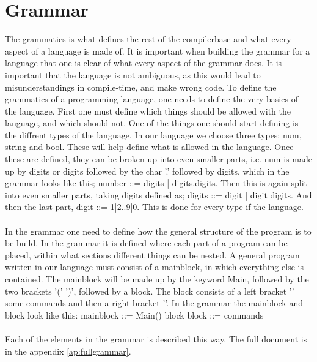\section{Grammar}
The grammatics is what defines the rest of the compilerbase and what every aspect of a language is made of.
It is important when building the grammar for a language that one is clear of what every aspect of the grammar does. It is important that the language is not ambiguous, as this would lead to misunderstandings in compile-time, and make wrong code.
To define the grammatics of a programming language, one needs to define the very basics of the language. First one must define which things should be allowed with the language, and which should not.
One of the things one should start defining is the diffrent types of the language. In our language we choose three types; num, string and bool. These will help define what is allowed in the language. Once these are defined, they can be broken up into even smaller parts, i.e. num is made up by digits or digits followed by the char '.' followed by digits, which in the grammar looks like this; number ::= digits | digits.digits.
Then this is again split into even smaller parts, taking digits defined as; digits ::= digit | digit digits. And then the last part, digit ::= 1|2..9|0. This is done for every type if the language.\\
\\
In the grammar one need to define how the general structure of the program is to be build. In the grammar it is defined where each part of a program can be placed, within what sections different things can be nested. A general program written in our language must consist of a mainblock, in which everything else is contained. The mainblock will be made up by the keyword Main, followed by the two brackets '(' ')', followed by a block.
The block consists of a left bracket '{' some commands and then a right bracket '}'. In the grammar the mainblock and block look like this: mainblock ::= Main() block
block ::= { commands }\\
\\
Each of the elements in the grammar is described this way. The full document is in the appendix \ref{ap:fullgrammar}.